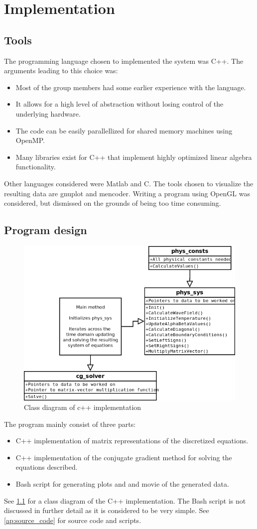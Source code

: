 
\chapter{Implementation}\label{avs:implementation}

\section{Tools}

The programming language chosen to implemented the system was C++.
The arguments leading to this choice was:
\begin{itemize}
\item Most of the group members had some earlier experience with the language.
\item It allows for a high level of abstraction without losing control of the
underlying hardware.
\item The code can be easily parallellized for shared memory machines using OpenMP.
\item Many libraries exist for C++ that implement highly optimized linear algebra
functionality.
\end{itemize}
Other languages considered were Matlab and C.
The tools chosen to visualize the resulting data are gnuplot and mencoder. Writing a
program using OpenGL was considered, but dismissed on the grounds of being too time consuming.

\section{Program design}

\begin{figure}[!h]
  \begin{center}
    \includegraphics[width=0.5\linewidth]{classdiagram.png}
  \end{center}
  \caption{Class diagram of c++ implementation}
  \label{fig:classdiagram}
\end{figure}
The program mainly consist of three parts:
\begin{itemize}
\item C++ implementation of matrix representations of the discretized equations.
\item C++ implementation of the conjugate gradient method for solving the
equations described.
\item Bash script for generating plots and and movie of the generated data.
\end{itemize}
See \cref{fig:classdiagram} for a class diagram of the C++ implementation.
The Bash script is not discussed in further detail as it is considered to be
very simple. See \cref{ap:source_code} for source code and scripts.


